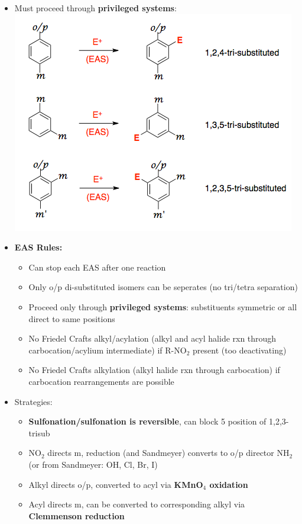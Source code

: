 \documentclass[10pt,landscape]{article}
\begin{document}
\begin{multicols*}{3}
\begin{scriptsize}
    \begin{itemize}
    \item Must proceed through \textbf{privileged systems}:
      \includegraphics[scale=0.4]{privsys.png}
    \item \textbf{EAS Rules:}
      \begin{itemize}
      \item Can stop each EAS after one reaction
      \item Only o/p di-substituted isomers can be seperates (no tri/tetra separation)
      \item Proceed only through \textbf{privileged systems}: substituents symmetric or all direct
        to same positions
      \item No Friedel Crafts alkyl/acylation (alkyl and acyl halide rxn through carbocation/acylium
        intermediate) if R-NO$_2$ present (too deactivating)
      \item No Friedel Crafts alkylation (alkyl halide rxn through carbocation) if
        carbocation rearrangements are possible
      \end{itemize}
    \item Strategies:
      \begin{itemize}
      \item \textbf{Sulfonation/sulfonation is reversible}, can block 5 position of 1,2,3-trisub
      \item NO$_2$ directs m, reduction (and Sandmeyer) converts to o/p director NH$_2$
        (or from Sandmeyer: OH, Cl, Br, I)
      \item Alkyl directs o/p, converted to acyl via \textbf{KMnO$_4$ oxidation }
      \item Acyl directs m, can be converted to corresponding alkyl via \textbf{Clemmenson
          reduction}
      \end{itemize}
    \end{itemize}


\end{scriptsize}
\end{multicols*}
\end{document}
